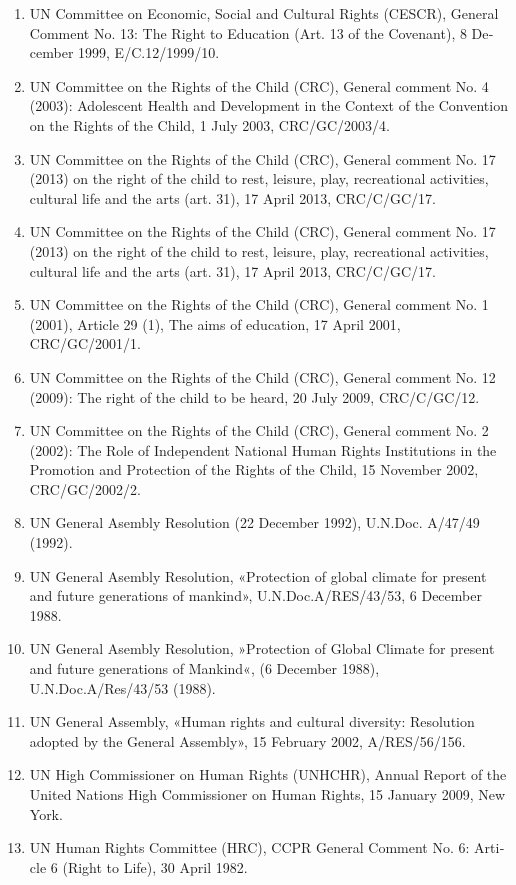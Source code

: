 {{{\begin{latin}
\begin{enumerate}
\item UN Committee on Economic, Social and Cultural Rights (CESCR), General Comment No. 13: The Right to Education (Art. 13 of the Covenant), 8 December 1999, E/C.12/1999/10.
\item UN Committee on the Rights of the Child (CRC), General comment No. 4 (2003): Adolescent Health and Development in the Context of the Convention on the Rights of the Child, 1 July 2003, CRC/GC/2003/4.
\item UN Committee on the Rights of the Child (CRC), General comment No. 17 (2013) on the right of the child to rest, leisure, play, recreational activities, cultural life and the arts (art. 31), 17 April 2013, CRC/C/GC/17.
\item UN Committee on the Rights of the Child (CRC), General comment No. 17 (2013) on the right of the child to rest, leisure, play, recreational activities, cultural life and the arts (art. 31), 17 April 2013, CRC/C/GC/17.
\item UN Committee on the Rights of the Child (CRC), General comment No. 1 (2001), Article 29 (1), The aims of education, 17 April 2001, CRC/GC/2001/1.
\item UN Committee on the Rights of the Child (CRC), General comment No. 12 (2009): The right of the child to be heard, 20 July 2009, CRC/C/GC/12.
\item UN Committee on the Rights of the Child (CRC), General comment No. 2 (2002): The Role of Independent National Human Rights Institutions in the Promotion and Protection of the Rights of the Child, 15 November 2002, CRC/GC/2002/2.
\item UN General Asembly Resolution (22 December 1992), U.N.Doc. A/47/49 (1992).
\item UN General Asembly Resolution, «Protection of global climate for present and future generations of mankind», U.N.Doc.A/RES/43/53, 6 December 1988.
\item UN General Asembly Resolution, »Protection of Global Climate for present and future generations of Mankind«, (6 December 1988), U.N.Doc.A/Res/43/53 (1988).
\item UN General Assembly, «Human rights and cultural diversity: Resolution adopted by the General Assembly», 15 February 2002, A/RES/56/156.
\item UN High Commissioner on Human Rights (UNHCHR), Annual Report of the United Nations High Commissioner on Human Rights, 15 January 2009, New York.
\item UN Human Rights Committee (HRC), CCPR General Comment No. 6: Article 6 (Right to Life), 30 April 1982.

\end{enumerate}
\end{latin}}}}
